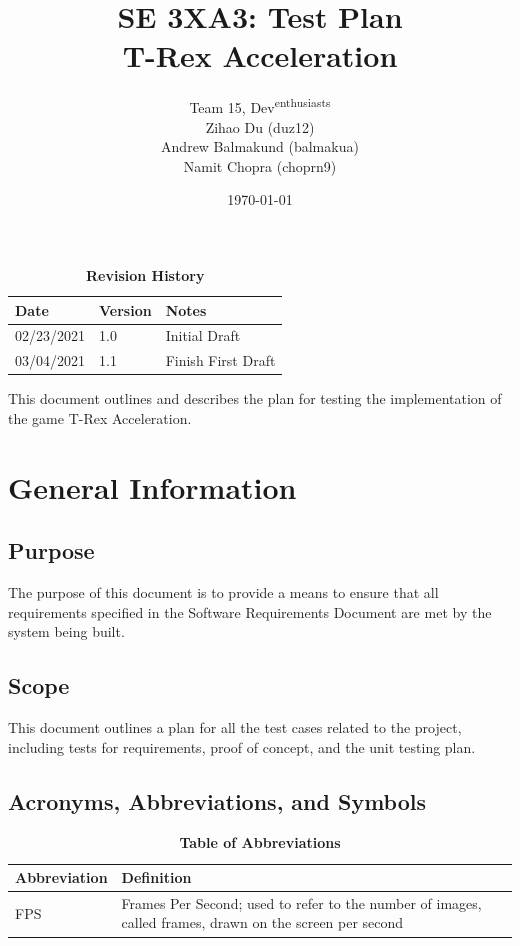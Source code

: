 \documentclass[12pt, titlepage]{article}
\title{SE 3XA3: Test Plan\\T-Rex Acceleration}
\author{Team 15, Dev\textsuperscript{enthusiasts}
		\\ Zihao Du (duz12)
		\\  Andrew Balmakund (balmakua) 
		\\ Namit Chopra (choprn9)
}
\date{\today}
\begin{document}
\maketitle

\tableofcontents
\listoftables
\listoffigures

\begin{table}[bp]
\caption{\bf Revision History}
\begin{tabularx}{\textwidth}{p{3cm}p{2cm}X}
\toprule {\bf Date} & {\bf Version} & {\bf Notes}\\
\midrule
02/23/2021 & 1.0 & Initial Draft\\
03/04/2021 & 1.1 & Finish First Draft\\
\bottomrule
\end{tabularx}
\end{table}

\newpage


This document outlines and describes the plan for testing the implementation of the game T-Rex Acceleration. 

\section{General Information}

\subsection{Purpose}
The purpose of this document is to provide a means to ensure that all requirements specified in the Software Requirements Document are met by the system being built.
\subsection{Scope}
This document outlines a plan for all the test cases related to the project, including tests for requirements, proof of concept, and the unit testing plan.
\subsection{Acronyms, Abbreviations, and Symbols}
	
\begin{table}[hbp]
\caption{\textbf{Table of Abbreviations}} \label{Table}

\begin{tabularx}{\textwidth}{p{3cm}X}
\toprule
\textbf{Abbreviation} & \textbf{Definition} \\
\midrule
FPS & Frames Per Second; used to refer to the number of images, called frames, drawn on the screen per second\\
\bottomrule
\end{tabularx}

\end{table}
\end{document}
